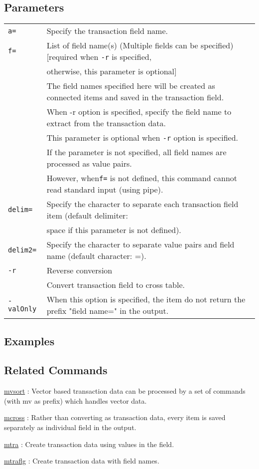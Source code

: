 \subsection*{Parameters}
\begin{table}[htbp]
{\small
\begin{tabular}{ll}
\verb|a=|      & Specify the transaction field name.\\
\verb|f=|      & List of field name(s) (Multiple fields can be specified) [required when \verb|-r| is specified, \\
		&  otherwise, this parameter is optional]\\
               & The field names specified here will be created as connected items and saved in the transaction field.\\
               & When -r option is specified, specify the field name to extract from the transaction data.\\
               & This parameter is optional when \verb|-r| option is specified.\\
               & If the parameter is not specified, all field names are processed as value pairs. \\
               & However, when\verb|f=| is not defined, this command cannot read standard input (using pipe). \\
\verb|delim=|  & Specify the character to separate each transaction field item (default delimiter: \\
		& space if this parameter is not defined).\\
\verb|delim2=| & Specify the character to separate value pairs and field name (default character: =).\\
\verb|-r|      & Reverse conversion\\
               & Convert transaction field to cross table. \\
\verb|-valOnly|& When this option is specified, the item do not return the prefix "field name=" in the output. \\
\end{tabular} 
}
\end{table} 

\subsection*{Examples}

\subsection*{Related Commands}
\hyperref[sect:mvsort] {mvsort} : Vector based transaction data can be processed by a set of commands  (with mv as prefix) which handles vector data.

\hyperref[sect:mcross] {mcross} : Rather than converting as transaction data, every item is saved separately as individual field in the output. 

\hyperref[sect:mtra] {mtra} : Create transaction data using values in the field.

\hyperref[sect:mtraflg] {mtraflg} :  Create transaction data with field names.

%
